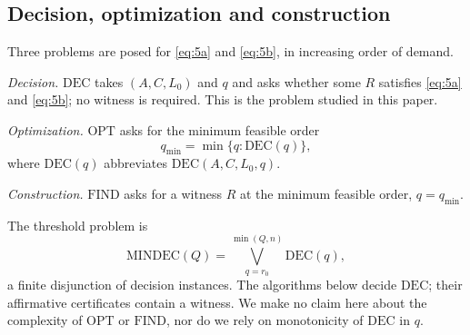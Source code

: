 \subsection{Decision, optimization and construction}\label{sec:problems}

Three problems are posed for \eqref{eq:5a} and \eqref{eq:5b}, in increasing order of
demand.

\emph{Decision.} $\mathrm{DEC}$ takes $(A,C,L_0)$ and $q$ and asks whether some $R$
satisfies \eqref{eq:5a} and \eqref{eq:5b}; no witness is required. This is the problem
studied in this paper.

\emph{Optimization.} $\mathrm{OPT}$ asks for the minimum feasible order
\begin{equation*}
q_{\min}=\min\{q:\mathrm{DEC}(q)\},
\end{equation*}
where $\mathrm{DEC}(q)$ abbreviates $\mathrm{DEC}(A,C,L_0,q)$.

\emph{Construction.} $\mathrm{FIND}$ asks for a witness $R$ at the minimum feasible
order, $q=q_{\min}$.

The threshold problem is
\begin{equation}\label{eq:mindec}
\mathrm{MINDEC}(Q)=\bigvee_{q=r_0}^{\min(Q,n)}\mathrm{DEC}(q),
\end{equation}
a finite disjunction of decision instances. The algorithms below decide $\mathrm{DEC}$;
their affirmative certificates contain a witness. We make no claim here about the
complexity of $\mathrm{OPT}$ or $\mathrm{FIND}$, nor do we rely on monotonicity of
$\mathrm{DEC}$ in $q$.
